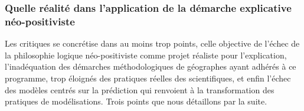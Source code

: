 


\subsubsection{Quelle réalité dans l'application de la démarche explicative néo-positiviste}
\label{sssec:realite_neopositiviste}

Les critiques se concrétise dans au moins trop points, celle objective de l'échec de la philosophie logique néo-positiviste comme projet réaliste pour l'explication, l'inadéquation des démarches méthodologiques de géographes ayant adhérés à ce programme, trop éloignés des pratiques réelles des scientifiques, et enfin l’échec des modèles centrés sur la prédiction qui renvoient à la transformation des pratiques de modélisations. Trois points que nous détaillons par la suite.

